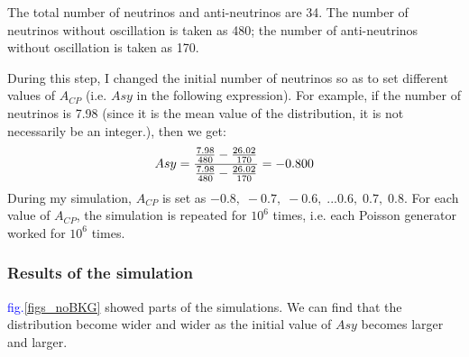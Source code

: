 \documentclass[a4paper,12pt]{article}
\begin{document}
The total number of neutrinos and anti-neutrinos are 34. The number of neutrinos without oscillation is taken as 480; the number of anti-neutrinos without oscillation is taken as 170. 

During this step, I changed the initial number of neutrinos so as to set different values of $A_{CP}$ (i.e. $Asy$ in the following expression). For example, if the number of neutrinos is 7.98 (since it is the mean value of the distribution, it is not necessarily be an integer.), then we get:
\begin{equation}
\large
    Asy=\frac{\frac{7.98}{480}-\frac{26.02}{170}}{\frac{7.98}{480}-\frac{26.02}{170}}=-0.800
    \label{asy_real}
\end{equation}
During my simulation, $A_{CP}$ is set as $-0.8,\;-0.7,\;-0.6,\;...0.6,\;0.7,\;0.8$. For each value of $A_{CP}$, the simulation is repeated for $10^6$ times, i.e. each Poisson generator worked for $10^6$ times.   


\subsubsection{Results of the simulation}
\textcolor{blue}{fig.\ref{figs_noBKG}} showed parts of the simulations. We can find that the distribution become wider and wider as the initial value of $Asy$ becomes larger and larger.
\end{document}
